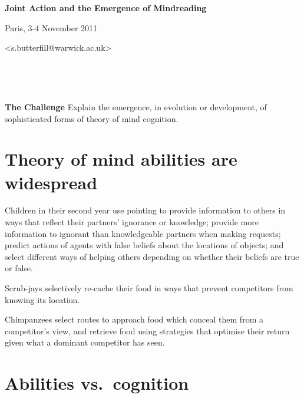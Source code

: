 \documentclass[11pt]{extarticle}
\date{}
\begin{document}
\begin{multicols}{3}

\setlength\footnotesep{1em}








\begin{center}
{\Large
\textbf{Joint Action and the Emergence of Mindreading}
}

Paris, 3-4 November 2011


<s.butterfill@warwick.ac.uk>

\end{center}



\

\ 

{\Large
\textbf{The Challenge}
Explain the emergence, in evolution or development, of sophisticated forms of theory of mind cognition.
}

\section{Theory of mind abilities are widespread}
Children in their second year use pointing to provide information to others\citep{Liszkowski:2006ec} in ways that reflect their partners’ ignorance or knowledge;\citep{Liszkowski:2008al} provide more information to ignorant than knowledgeable partners when making requests;\citep{ONeill:1996um}  predict actions of agents with false beliefs about the locations of objects;\citep{Onishi:2005hm,Southgate:2007js} and select different ways of helping others depending on whether their beliefs are true or false.\citep{Buttelmann:2009gy}

Scrub-jays selectively re-cache their food in ways that prevent competitors from knowing its location.\citep{Clayton:2007fh}

Chimpanzees select routes to approach food which conceal them from a competitor’s view,\citep{Hare:2006ih} and retrieve food using strategies that optimise their return given what a dominant competitor has seen.\citep{Hare:2001ph}


\section{Abilities vs.\ cognition}


\end{multicols}
\end{document}
